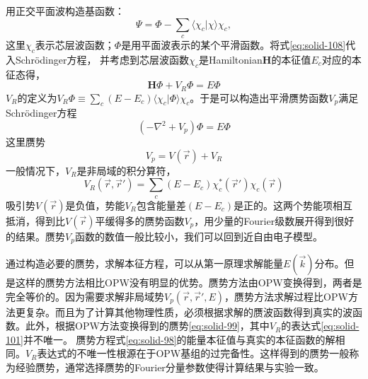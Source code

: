 用正交平面波构造基函数：
\begin{equation}
  \Psi=\Phi-\sum_c\langle\chi_c|\chi\rangle\chi_c,
  \label{eq:solid-108}
\end{equation}
这里$\chi_c$表示芯层波函数；$\Phi$是用平面波表示的某个平滑函数。将式\eqref{eq:solid-108}代入Schr\"odinger方程，%
并考虑到芯层波函数$\chi_c$是Hamiltonian$\mathbf H$的本征值$E_c$对应的本征态得，%
\begin{equation}
  \mathbf H\Phi+V_R\Phi=E\Phi
  \label{eq:solid-97}
\end{equation}
$V_R$的定义为$V_R\Phi\equiv\sum\limits_c(E-E_c)\langle\chi_c|\Phi\rangle\chi_c$。于是可以构造出平滑赝势函数$V_p$满足Schr\"odinger方程
\begin{equation}
  (-\nabla^2+V_p)\Phi=E\Phi
  \label{eq:solid-98}
\end{equation}
这里赝势
\begin{equation}
  V_p=V(\vec r)+V_R
  \label{eq:solid-99}
\end{equation}
一般情况下，$V_R$是非局域的积分算符，%
\begin{equation}
  V_R(\vec r,\vec r')=\sum_c(E-E_c)\chi_c^{\ast}(\vec r')\chi_c(\vec r)
 \label{eq:solid-101}
\end{equation}
吸引势$V(\vec r)$是负值，势能$V_R$包含能量差$(E-E_c)$是正的。这两个势能项相互抵消，得到比$V(\vec r)$平缓得多的赝势函数$V_p$，用少量的Fourier级数展开得到很好的结果。赝势$V_p$函数的数值一般比较小，我们可以回到近自由电子模型。

通过构造必要的赝势，求解本征方程，可以从第一原理求解能量$E(\vec k)$分布。但是这样的赝势方法相比OPW没有明显的优势。赝势方法由OPW变换得到，两者是完全等价的。因为需要求解非局域势$V_p(\vec r,\vec r',E)$，赝势方法求解过程比OPW方法更复杂。而且为了计算其他物理性质，必须根据求解的赝波函数得到真实的波函数。此外，根据OPW方法变换得到的赝势\eqref{eq:solid-99}，其中$V_R$的表达式\eqref{eq:solid-101}并不唯一。%
赝势方程式\eqref{eq:solid-98}的能量本征值与真实的本征函数的解相同\cite{Harrison}。$V_R$表达式的不唯一性根源在于OPW基组的过完备性。这样得到的赝势一般称为经验赝势，通常选择赝势的Fourier分量参数使得计算结果与实验一致。


